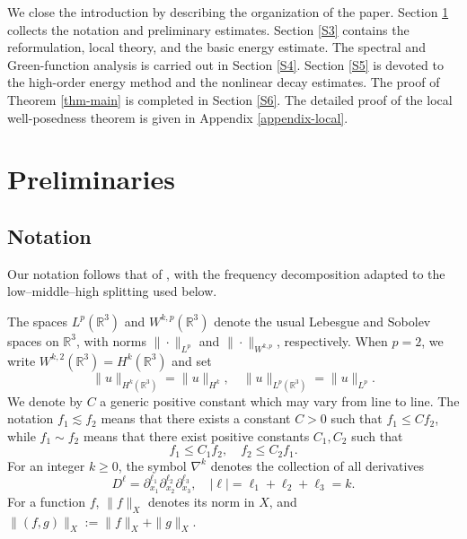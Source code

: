 \documentclass[10pt,reqno]{amsart}
\numberwithin{equation}{section}
\begin{document}
%
%
%
%
%
%

We close the introduction by describing the organization of the paper. Section \ref{S2} collects the notation and preliminary estimates. Section \ref{S3} contains the reformulation, local theory, and the basic energy estimate. The spectral and Green-function analysis is carried out in Section \ref{S4}. Section \ref{S5} is devoted to the high-order energy method and the nonlinear decay estimates. The proof of Theorem \ref{thm-main} is completed in Section \ref{S6}. The detailed proof of the local well-posedness theorem is given in Appendix \ref{appendix-local}.

 


%
%
%
%
%
%


\section{Preliminaries}\label{S2}


%
%
%
%
%
%

\subsection{Notation}

Our notation follows that of \cite{HTWZ24}, with the frequency decomposition adapted to the low--middle--high splitting used below.

The spaces $L^p(\mathbb{R}^3)$ and $W^{k,p}(\mathbb{R}^3)$ denote the usual Lebesgue and Sobolev spaces on $\mathbb{R}^3$, with norms $\|\cdot\|_{L^p}$ and $\|\cdot\|_{W^{k,p}}$, respectively.  When $p=2$, we write $W^{k,2}(\mathbb{R}^3)=H^k(\mathbb{R}^3)$ and set
\[%
\|u\|_{H^k(\mathbb{R}^3)}=\|u\|_{H^k},
\quad
\|u\|_{L^p(\mathbb{R}^3)}=\|u\|_{L^p}.
\]%
We denote by $C$ a generic positive constant which may vary from line to line. The notation $f_1\lesssim f_2$ means that there exists a constant $C>0$ such that $f_1\leq C f_2$, while $f_1\sim f_2$ means that there exist positive constants $C_1,C_2$ such that
\[
f_1\leq C_1f_2,
\quad
f_2\leq C_2f_1.
\]
For an integer $k\geq0$, the symbol $\nabla^k$ denotes the collection of all
derivatives
\[
D^\ell
=\partial_{x_1}^{\ell_1}\partial_{x_2}^{\ell_2}\partial_{x_3}^{\ell_3},
\quad
|\ell|=\ell_1+\ell_2+\ell_3=k.
\]
For a function $f$, $\|f\|_X$ denotes its norm in $X$, and
$\|(f,g)\|_X:=\|f\|_X+\|g\|_X$.
\end{document}
